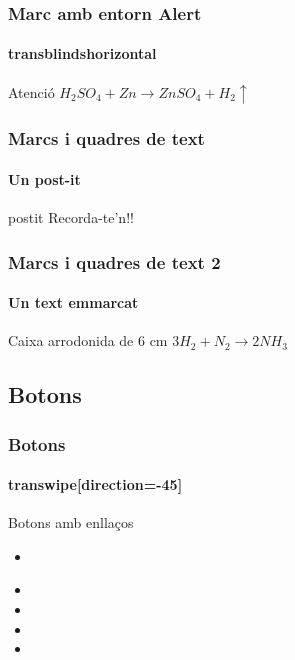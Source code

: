 \documentclass{beamer}
\begin{document}
\begin{frame}
  \frametitle{Marc amb entorn Alert}
    \framesubtitle{transblindshorizontal}

      \begin{alertblock}{Atenció}
           $H_2 SO_4 + Zn \rightarrow ZnSO_4 + H_2\uparrow $
      \end{alertblock}
\transblindshorizontal
\end{frame}

\begin{frame}
  \frametitle{Marcs i quadres de text}
    \framesubtitle{Un post-it}
      \begin{beamercolorbox}[sep=1em,wd=5cm,shadow=true,rounded=true]{postit}
            \centering            
            Recorda-te'n!!
      \end{beamercolorbox}
\end{frame}
     
\begin{frame}
  \frametitle{Marcs i quadres de text 2}
    \framesubtitle{Un text emmarcat}     
      \begin{beamerboxesrounded}[upper=block body,lower=block body,shadow=true,width=6cm]{Caixa arrodonida de 6 cm}
       \centering
             $3 H_2 + N_2 \rightarrow 2 NH_3$
      \end{beamerboxesrounded}

  \transwipe[direction=90]
\end{frame}


\subsection{Botons}
\begin{frame}
  \frametitle{Botons}
    \framesubtitle{transwipe[direction=-45]}
    \begin{block}{Botons amb enllaços}
           \begin{itemize}
					\item \href{http://phobos.xtec.cat/jqueralt}{}
		            \item {}
		            \item {}
		            \item {}
		            \item {}
		   \end{itemize}
	\end{block} 	
  \transwipe[direction=-45]
\end{frame}
\end{document}
